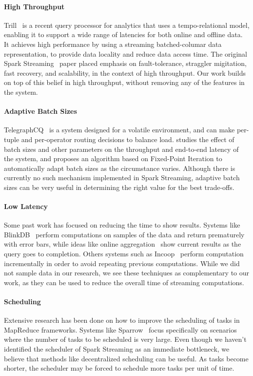 \paragraph {\bf High Throughput} Trill~\cite{Trill} is a recent query processor for analytics that uses a tempo-relational model, enabling it to support a wide range of latencies for both online and offline data. It achieves high performance by using a streaming batched-columar data representation, to provide data locality and reduce data access time.
The original Spark Streaming~\cite{SparkStreaming} paper placed emphasis on fault-tolerance, straggler migitation, fast recovery, and scalability, in the context of high throughput. Our work builds on top of this belief in high throughput, without removing any of the features in the system.

\paragraph {\bf Adaptive Batch Sizes} TelegraphCQ~\cite{TelegraphCQ} is a system designed for a volatile environment, and can make per-tuple and per-operator routing decisions to balance load. \cite{das2014adaptive} studies the effect of batch sizes and other parameters on the throughput and end-to-end latency of the system, and proposes an algorithm based on Fixed-Point Iteration to automatically adapt batch sizes as the circumstance varies. Although there is currently no such mechanism implemented in Spark Streaming, adaptive batch sizes can be very useful in determining the right value for the best trade-offs.

\paragraph {\bf Low Latency} Some past work has focused on reducing the time to show results. Systems like BlinkDB~\cite{BlinkDB} perform computations on samples of the data and return prematurely with error bars, while ideas like online aggregation~\cite{OnlineAggregation} show current results as the query goes to completion.
Others systems such as Incoop~\cite{Incoop} perform computation incrementally in order to avoid repeating previous computations. 
While we did not sample data in our research, we see these techniques as complementary to our work, as they can be used to reduce the overall time of streaming computations.

\paragraph {\bf Scheduling} Extensive research has been done on how to improve the scheduling of tasks in MapReduce frameworks. 
Systems like Sparrow~\cite{Sparrow} focus specifically on scenarios where the number of tasks to be scheduled is very large.
Even though we haven't identified the scheduler of Spark Streaming as an immediate bottleneck, we believe that methods like decentralized scheduling can be useful. As tasks become shorter, the scheduler may be forced to schedule more tasks per unit of time. 